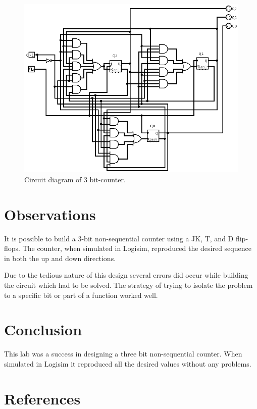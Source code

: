 \documentclass[12pt]{article}
\begin{document}
\begin{figure}
\center
\includegraphics[scale=0.5]{lab11-circuit}
\caption{Circuit diagram of 3 bit-counter.}
\label{fig:circ}
\end{figure}



\section{Observations}

\samepage
It is possible to build a 3-bit non-sequential counter using a JK,
T, and D flip-flops.
The counter, when simulated in Logisim, reproduced the desired sequence
in both the up and down directions.

Due to the tedious nature of this design several errors did
occur while building the circuit which had to be solved.
The strategy of trying to isolate the problem to a specific bit
or part of a function worked well.


\section{Conclusion}

This lab was a success in designing a three bit non-sequential counter.
When simulated in Logisim it reproduced all the desired values without
any problems.



\renewcommand*{\refname}{\vspace{-8mm}}
\section{References}


\end{document}
